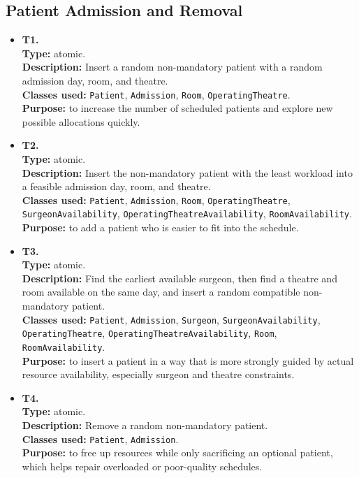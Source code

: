 \documentclass[10pt]{article}
\newcommand{\tlabel}[1]{{\large\bfseries #1}}
\begin{document}
\subsection{Patient Admission and Removal}
\begin{itemize}
    \item \tlabel{T1.}\\
    \textbf{Type:} atomic.\\
    \textbf{Description:} Insert a random non-mandatory patient with a random admission day, room, and theatre.\\
    \textbf{Classes used:} \texttt{Patient}, \texttt{Admission}, \texttt{Room}, \texttt{OperatingTheatre}.\\
    \textbf{Purpose:} to increase the number of scheduled patients and explore new possible allocations quickly.
    
    \item \tlabel{T2.}\\
    \textbf{Type:} atomic.\\
    \textbf{Description:} Insert the non-mandatory patient with the least workload into a feasible admission day, room, and theatre.\\
    \textbf{Classes used:} \texttt{Patient}, \texttt{Admission}, \texttt{Room}, \texttt{OperatingTheatre}, \texttt{SurgeonAvailability}, \texttt{OperatingTheatreAvailability}, \texttt{RoomAvailability}.\\
    \textbf{Purpose:} to add a patient who is easier to fit into the schedule.
    
    \item \tlabel{T3.}\\
    \textbf{Type:} atomic.\\
    \textbf{Description:} Find the earliest available surgeon, then find a theatre and room available on the same day, and insert a random compatible non-mandatory patient.\\
    \textbf{Classes used:} \texttt{Patient}, \texttt{Admission}, \texttt{Surgeon}, \texttt{SurgeonAvailability}, \texttt{OperatingTheatre}, \texttt{OperatingTheatreAvailability}, \texttt{Room}, \texttt{RoomAvailability}.\\
    \textbf{Purpose:} to insert a patient in a way that is more strongly guided by actual resource availability, especially surgeon and theatre constraints.
    
    \item \tlabel{T4.}\\
    \textbf{Type:} atomic.\\
    \textbf{Description:} Remove a random non-mandatory patient.\\
    \textbf{Classes used:} \texttt{Patient}, \texttt{Admission}.\\
    \textbf{Purpose:} to free up resources while only sacrificing an optional patient, which helps repair overloaded or poor-quality schedules.
    

\end{itemize}
\end{document}
